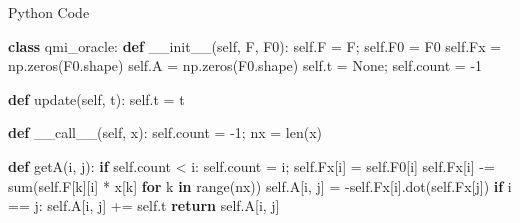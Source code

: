 \documentclass[10pt,ignorenonframetext,serif,onlymath]{beamer}
\newenvironment{Shaded}{}{}
\newcommand{\BuiltInTok}[1]{#1}
\newcommand{\ControlFlowTok}[1]{\textcolor[rgb]{0.00,0.44,0.13}{\textbf{#1}}}
\newcommand{\DecValTok}[1]{\textcolor[rgb]{0.25,0.63,0.44}{#1}}
\newcommand{\FunctionTok}[1]{\textcolor[rgb]{0.02,0.16,0.49}{#1}}
\newcommand{\KeywordTok}[1]{\textcolor[rgb]{0.00,0.44,0.13}{\textbf{#1}}}
\newcommand{\NormalTok}[1]{#1}
\newcommand{\OperatorTok}[1]{\textcolor[rgb]{0.40,0.40,0.40}{#1}}
\newcommand{\VariableTok}[1]{\textcolor[rgb]{0.10,0.09,0.49}{#1}}
\begin{document}
\begin{frame}[fragile]{Python Code}
\protect\hypertarget{python-code-1}{}

\scriptsize

\begin{Shaded}
\begin{Highlighting}[]
\KeywordTok{class}\NormalTok{ qmi_oracle:}
    \KeywordTok{def} \FunctionTok{__init__}\NormalTok{(}\VariableTok{self}\NormalTok{, F, F0):}
        \VariableTok{self}\NormalTok{.F }\OperatorTok{=}\NormalTok{ F}\OperatorTok{;} \VariableTok{self}\NormalTok{.F0 }\OperatorTok{=}\NormalTok{ F0}
        \VariableTok{self}\NormalTok{.Fx }\OperatorTok{=}\NormalTok{ np.zeros(F0.shape)}
        \VariableTok{self}\NormalTok{.A }\OperatorTok{=}\NormalTok{ np.zeros(F0.shape)}
        \VariableTok{self}\NormalTok{.t }\OperatorTok{=} \VariableTok{None}\OperatorTok{;} \VariableTok{self}\NormalTok{.count }\OperatorTok{=} \DecValTok{-1}

    \KeywordTok{def}\NormalTok{ update(}\VariableTok{self}\NormalTok{, t): }\VariableTok{self}\NormalTok{.t }\OperatorTok{=}\NormalTok{ t}

    \KeywordTok{def} \FunctionTok{__call__}\NormalTok{(}\VariableTok{self}\NormalTok{, x):}
        \VariableTok{self}\NormalTok{.count }\OperatorTok{=} \DecValTok{-1}\OperatorTok{;}\NormalTok{ nx }\OperatorTok{=} \BuiltInTok{len}\NormalTok{(x)}

        \KeywordTok{def}\NormalTok{ getA(i, j):}
            \ControlFlowTok{if} \VariableTok{self}\NormalTok{.count }\OperatorTok{<}\NormalTok{ i:}
                \VariableTok{self}\NormalTok{.count }\OperatorTok{=}\NormalTok{ i}\OperatorTok{;} \VariableTok{self}\NormalTok{.Fx[i] }\OperatorTok{=} \VariableTok{self}\NormalTok{.F0[i]}
                \VariableTok{self}\NormalTok{.Fx[i] }\OperatorTok{-=} \BuiltInTok{sum}\NormalTok{(}\VariableTok{self}\NormalTok{.F[k][i] }\OperatorTok{*}\NormalTok{ x[k]}
                                  \ControlFlowTok{for}\NormalTok{ k }\KeywordTok{in} \BuiltInTok{range}\NormalTok{(nx))}
            \VariableTok{self}\NormalTok{.A[i, j] }\OperatorTok{=} \OperatorTok{-}\VariableTok{self}\NormalTok{.Fx[i].dot(}\VariableTok{self}\NormalTok{.Fx[j])}
            \ControlFlowTok{if}\NormalTok{ i }\OperatorTok{==}\NormalTok{ j: }\VariableTok{self}\NormalTok{.A[i, j] }\OperatorTok{+=} \VariableTok{self}\NormalTok{.t}
            \ControlFlowTok{return} \VariableTok{self}\NormalTok{.A[i, j]}


\end{Highlighting}
\end{Shaded}
\end{frame}
\end{document}
